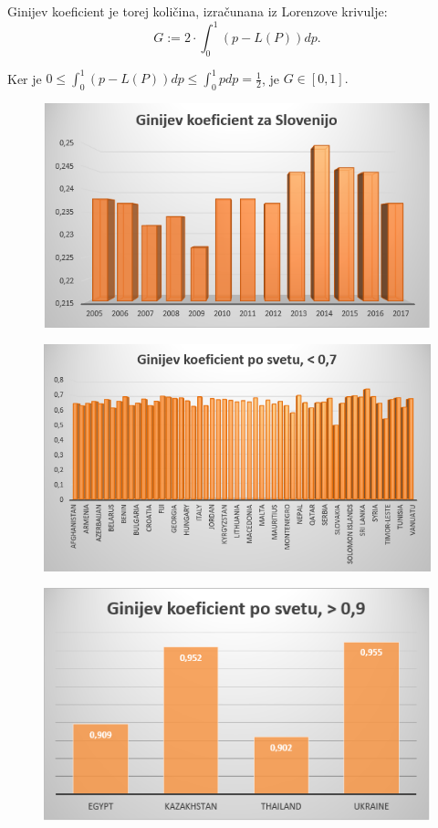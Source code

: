 \documentclass[a4paper,12 pt]{article}
\begin{document}
Ginijev koeficient je torej količina, izračunana iz Lorenzove krivulje: 
$$G := 2 \cdot \int_{0}^{1} (p - L(P)) dp. $$

Ker je $0 \leq \int_{0}^{1} (p - L(P)) dp \leq \int_{0}^{1} p dp = \frac{1}{2}$, je $G \in [0, 1].$

\begin{figure}
\includegraphics[width= \linewidth]{./slike/gini-slo.png}
\end{figure}

\begin{figure}
\includegraphics[width= \linewidth]{./slike/gini-manj-07.png}
\end{figure}

\begin{figure}
\includegraphics[width= \linewidth]{./slike/gini-vec-09.png}
\end{figure}
\end{document}
